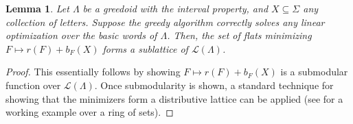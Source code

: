 \documentclass[11pt]{article}
\newtheorem{lemma}[theorem]{Lemma}
\newcommand{\univ}{\Sigma}
\newcommand{\glang}{\Lambda}
\providecommand{\L}{}
\renewcommand{\L}{\mathscr{L}}
\begin{document}
\begin{lemma}\label{lem:floor-psi-min-lattice}
    Let $\glang$ be a greedoid with the interval property, and $X\subseteq \univ$ any collection of letters.
    Suppose the greedy algorithm correctly solves any linear optimization over the basic words of $\glang$.
    Then, the set of flats minimizing $F\mapsto r(F) + b_F(X)$ forms a sublattice of $\L(\glang)$.
\end{lemma}
\begin{proof}
    This essentially follows by showing $F\mapsto r(F) + b_F(X)$ is a submodular function over $\L(\glang)$.
    Once submodularity is shown, a standard technique for showing that the minimizers form a distributive lattice can be applied (see \cite{queyranne1998minimizing} for a working example over a ring of sets).


\end{proof}
\end{document}
